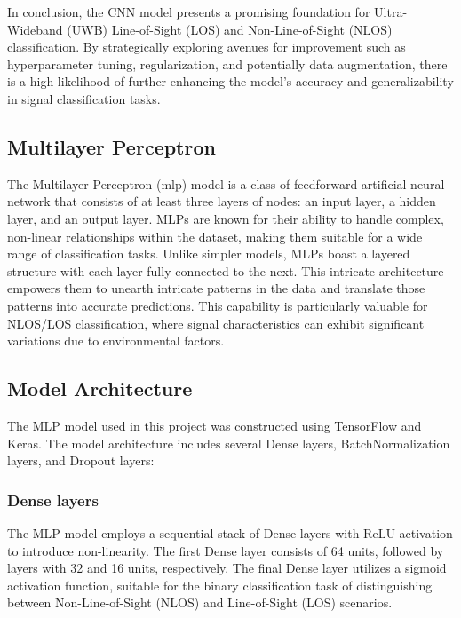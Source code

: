 In conclusion, the CNN model presents a promising foundation for Ultra-Wideband (UWB) Line-of-Sight (LOS) and Non-Line-of-Sight (NLOS) classification. By strategically exploring avenues for improvement such as hyperparameter tuning, regularization, and potentially data augmentation, there is a high likelihood of further enhancing the model's accuracy and generalizability in signal classification tasks.



\subsection{\Gls{Multilayer Perceptron}}\label{mlp}                                                                                 
The Multilayer Perceptron (\acrshort{mlp}) model is a class of feedforward artificial neural network that consists of at least three layers of nodes: an input layer, a hidden layer, and an output layer. MLPs are known for their ability to handle complex, non-linear relationships within the dataset, making them suitable for a wide range of classification tasks. Unlike simpler models, MLPs boast a layered structure with each layer fully connected to the next. This intricate architecture empowers them to unearth intricate patterns in the data and translate those patterns into accurate predictions. This capability is particularly valuable for NLOS/LOS classification, where signal characteristics can exhibit significant variations due to environmental factors.

\subsection{Model Architecture}

The MLP model used in this project was constructed using TensorFlow and Keras. The model architecture includes several Dense layers, BatchNormalization layers, and Dropout layers:

\subsubsection{Dense layers}

The MLP model employs a sequential stack of Dense layers with ReLU activation to introduce non-linearity. The first Dense layer consists of 64 units, followed by layers with 32 and 16 units, respectively. The final Dense layer utilizes a sigmoid activation function, suitable for the binary classification task of distinguishing between Non-Line-of-Sight (NLOS) and Line-of-Sight (LOS) scenarios.

